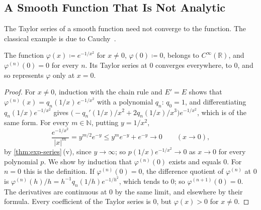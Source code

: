 \subsection{A Smooth Function That Is Not Analytic}

The Taylor series of a smooth function need not converge to the function. The classical example is due to Cauchy~\cite{cauchy1823}.

\begin{proposition}
\label{prop:flat-function}
The function $\varphi(x)\coloneqq e^{-1/x^2}$ for $x\ne0$, $\varphi(0)\coloneqq0$, belongs to $C^\infty(\mathbb R)$, and $\varphi^{(n)}(0)=0$ for every $n$. Its Taylor series at $0$ converges everywhere, to $0$, and so represents $\varphi$ only at $x=0$.
\end{proposition}

\begin{proof}
For $x\ne0$, induction with the chain rule and $E'=E$ shows that $\varphi^{(n)}(x)=q_n(1/x)\,e^{-1/x^2}$ with a polynomial $q_n$: $q_0=1$, and differentiating $q_n(1/x)e^{-1/x^2}$ gives $\bigl(-q_n'(1/x)/x^2+2q_n(1/x)/x^3\bigr)e^{-1/x^2}$, which is of the same form. For every $m\in\mathbb N$, putting $y=1/x^2$,
\[
\frac{e^{-1/x^2}}{|x|^m}=y^{m/2}e^{-y}\le y^me^{-y}+e^{-y}\to0\qquad(x\to0),
\]
by \cref{thm:exp-series}\,(v), since $y\to\infty$; so $p(1/x)e^{-1/x^2}\to0$ as $x\to0$ for every polynomial $p$. We show by induction that $\varphi^{(n)}(0)$ exists and equals $0$. For $n=0$ this is the definition. If $\varphi^{(n)}(0)=0$, the difference quotient of $\varphi^{(n)}$ at $0$ is $\varphi^{(n)}(h)/h=h^{-1}q_n(1/h)e^{-1/h^2}$, which tends to $0$; so $\varphi^{(n+1)}(0)=0$. The derivatives are continuous at $0$ by the same limit, and elsewhere by their formula. Every coefficient of the Taylor series is $0$, but $\varphi(x)>0$ for $x\ne0$.
\end{proof}

\begin{figure}
\end{figure}

